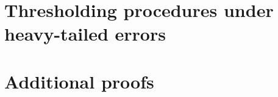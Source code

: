 \section{Thresholding procedures under heavy-tailed errors}
\label{suppsec:heavy-tailed}



\section{Additional proofs}
\label{suppsec:proofs}









